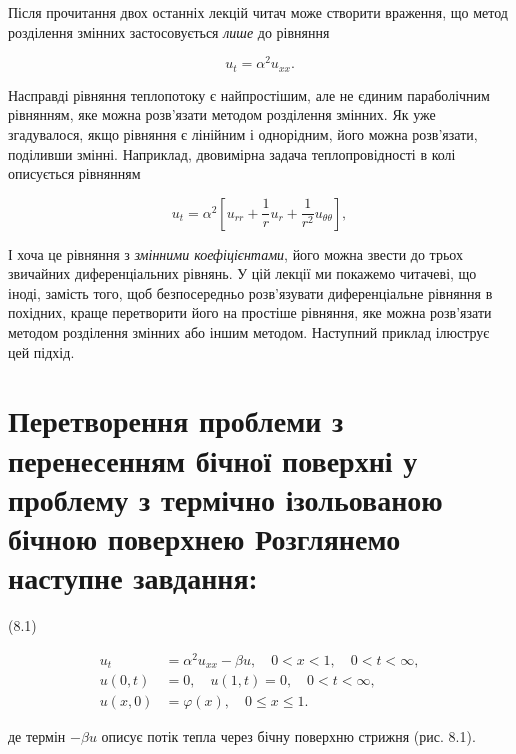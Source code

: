 \documentclass[
  ukrainian,
]{article}
\begin{document}
Після прочитання двох останніх лекцій читач може створити враження, що
метод розділення змінних застосовується \emph{лише} до рівняння

\[
u_t = \alpha^2 u_{xx}.
\]

Насправді рівняння теплопотоку є найпростішим, але не єдиним
параболічним рівнянням, яке можна розв'язати методом розділення змінних.
Як уже згадувалося, якщо рівняння є лінійним і однорідним, його можна
розв'язати, поділивши змінні. Наприклад, двовимірна задача
теплопровідності в колі описується рівнянням

\[
u_t = \alpha^2 \left[ u_{rr} + \frac{1}{r} u_r + \frac{1}{r^2} u_{\theta\theta} \right],
\]

І хоча це рівняння з \emph{змінними коефіцієнтами}, його можна звести до
трьох звичайних диференціальних рівнянь. У цій лекції ми покажемо
читачеві, що іноді, замість того, щоб безпосередньо розв'язувати
диференціальне рівняння в похідних, краще перетворити його на простіше
рівняння, яке можна розв'язати методом розділення змінних або іншим
методом. Наступний приклад ілюструє цей підхід.

\section{Перетворення проблеми з перенесенням бічної поверхні у проблему
з термічно ізольованою бічною поверхнею Розглянемо наступне
завдання:}\label{ux43fux435ux440ux435ux442ux432ux43eux440ux435ux43dux43dux44f-ux43fux440ux43eux431ux43bux435ux43cux438-ux437-ux43fux435ux440ux435ux43dux435ux441ux435ux43dux43dux44fux43c-ux431ux456ux447ux43dux43eux457-ux43fux43eux432ux435ux440ux445ux43dux456-ux443-ux43fux440ux43eux431ux43bux435ux43cux443-ux437-ux442ux435ux440ux43cux456ux447ux43dux43e-ux456ux437ux43eux43bux44cux43eux432ux430ux43dux43eux44e-ux431ux456ux447ux43dux43eux44e-ux43fux43eux432ux435ux440ux445ux43dux435ux44e-ux440ux43eux437ux433ux43bux44fux43dux435ux43cux43e-ux43dux430ux441ux442ux443ux43fux43dux435-ux437ux430ux432ux434ux430ux43dux43dux44f}

(8.1)

\[
\begin{aligned}
u_{t} &= \alpha^{2}u_{xx} - \beta u, \quad 0 < x < 1, \quad 0 < t < \infty,\\
u(0, t) &= 0, \quad u(1, t) = 0, \quad 0 < t < \infty,\\
u(x, 0) &= \varphi(x), \quad 0 \le x \le 1.
\end{aligned}
\]

де термін \(-\beta u\) описує потік тепла через бічну поверхню стрижня
(рис. 8.1).
\end{document}
